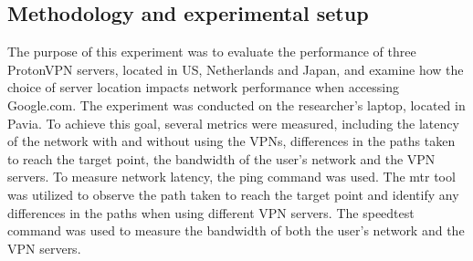 \documentclass[eng]{class}
\begin{document}
\subsection{Methodology and experimental setup}
The purpose of this experiment was to evaluate the performance of three ProtonVPN servers, located in US, Netherlands and Japan,
and examine how the choice of server location impacts network performance when accessing Google.com. The experiment was conducted on the researcher's laptop, located in Pavia.\newline
To achieve this goal, several metrics were measured, including the latency of the network with and without using the VPNs,
differences in the paths taken to reach the target point, the bandwidth of the user's network and the VPN servers.\newline
To measure network latency, the ping command was used.
The mtr tool was utilized to observe the path taken to reach the target point and identify any differences in the paths when using different VPN servers.
The speedtest command was used to measure the bandwidth of both the user's network and the VPN servers.
\end{document}
